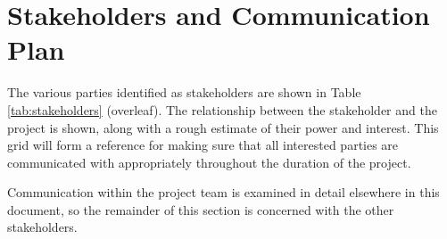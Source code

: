 \section{Stakeholders and Communication Plan}
\label{section:communication}

The various parties identified as stakeholders are shown in Table \ref{tab:stakeholders} (overleaf). The relationship between the stakeholder and the project is shown, along with a rough estimate of their power and interest. This grid will form a reference for making sure that all interested parties are communicated with appropriately throughout the duration of the project.

\noindent Communication within the project team is examined in detail elsewhere in this document, so the remainder of this section is concerned with the other stakeholders.

\vspace{1em}

